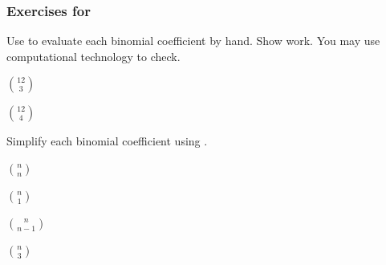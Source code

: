 

\subsubsection*{Exercises for  \subfactorialbinom}

\begin{exer}[\exerP] %
\label{exer_eval_binom_formula}  
    Use  to evaluate each binomial coefficient by hand. Show work.  You may use computational technology to check.
        \begin{exerpart}
            \item $\binom{12}{3}$
            \item $\binom{12}{4}$
        \end{exerpart}
\end{exer}

\begin{exer}[\exerP] %
\label{exer_simplify_binom_formula} 
    Simplify each binomial coefficient using .
        \begin{exerpart}
            \item $\binom{n}{n}$
            \item $\binom{n}{1}$
            \item $\binom{n}{n-1}$
            \item $\binom{n}{3}$
        \end{exerpart}
\end{exer}

